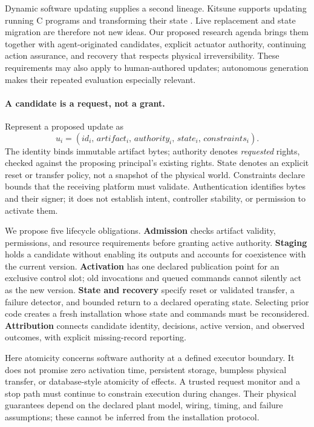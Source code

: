 \documentclass{article}
\begin{document}
Dynamic software updating supplies a second lineage. Kitsune supports updating running C programs and transforming their state \citep{hayden2014kitsune}. Live replacement and state migration are therefore not new ideas. Our proposed research agenda brings them together with agent-originated candidates, explicit actuator authority, continuing action assurance, and recovery that respects physical irreversibility. These requirements may also apply to human-authored updates; autonomous generation makes their repeated evaluation especially relevant.

\paragraph{A candidate is a request, not a grant.}
Represent a proposed update as
\begin{equation}
 u_i=(id_i,\,artifact_i,\,authority_i,\,state_i,\,constraints_i).
\end{equation}
The identity binds immutable artifact bytes; authority denotes \emph{requested} rights, checked against the proposing principal's existing rights. State denotes an explicit reset or transfer policy, not a snapshot of the physical world. Constraints declare bounds that the receiving platform must validate. Authentication identifies bytes and their signer; it does not establish intent, controller stability, or permission to activate them.

We propose five lifecycle obligations. \textbf{Admission} checks artifact validity, permissions, and resource requirements before granting active authority. \textbf{Staging} holds a candidate without enabling its outputs and accounts for coexistence with the current version. \textbf{Activation} has one declared publication point for an exclusive control slot; old invocations and queued commands cannot silently act as the new version. \textbf{State and recovery} specify reset or validated transfer, a failure detector, and bounded return to a declared operating state. Selecting prior code creates a fresh installation whose state and commands must be reconsidered. \textbf{Attribution} connects candidate identity, decisions, active version, and observed outcomes, with explicit missing-record reporting.

Here atomicity concerns software authority at a defined executor boundary. It does not promise zero activation time, persistent storage, bumpless physical transfer, or database-style atomicity of effects. A trusted request monitor and a stop path must continue to constrain execution during changes. Their physical guarantees depend on the declared plant model, wiring, timing, and failure assumptions; these cannot be inferred from the installation protocol.
\end{document}
